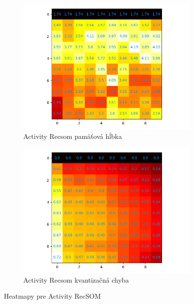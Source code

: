 \begin{figure}[H]
    \centering
    \begin{subfigure}{.5\textwidth}
        \centering
        \includegraphics[width=\linewidth]{assets/activity_recsom_memory_span}
        \caption{Activity Recsom pamäťová hĺbka}
        \label{fig:sub1}
    \end{subfigure}%
    \begin{subfigure}{.5\textwidth}
        \centering
        \includegraphics[width=\linewidth]{assets/activity_recsom_quantization_errors}
        \caption{Activity Recsom kvantizačná chyba}
        \label{fig:sub2}
    \end{subfigure}
    \caption{Heatmapy pre Activity RecSOM}
    \label{fig:test}
\end{figure}
    
